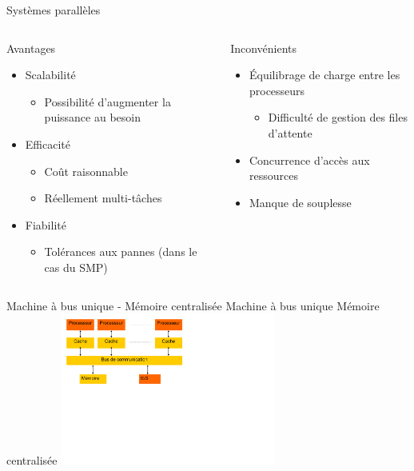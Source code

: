 \begin{frame}{Systèmes parallèles}
\begin{columns}
\begin{block}{Avantages}
\begin{itemize}
\item Scalabilité
\begin{itemize}
\item Possibilité d'augmenter la puissance au besoin
\end{itemize}
\item Efficacité
\begin{itemize}
\item Coût raisonnable
\item Réellement multi-tâches
\end{itemize}
\item Fiabilité
\begin{itemize}
\item Tolérances aux pannes (dans le cas du SMP)
\end{itemize}
\end{itemize}
\end{block}
\begin{block}{Inconvénients}
\begin{itemize}
\item Équilibrage de charge entre les processeurs
\begin{itemize}\item Difficulté de gestion des files d'attente\end{itemize}
\item Concurrence d'accès aux ressources
\item Manque de souplesse
\end{itemize}
\end{block}
\end{columns}
\end{frame}


\begin{frame}{Machine à bus unique - Mémoire centralisée}
Machine à bus unique Mémoire centralisée
\includegraphics[height=5cm]{../illustration/para_mem_commun.pdf}
\end{frame}

